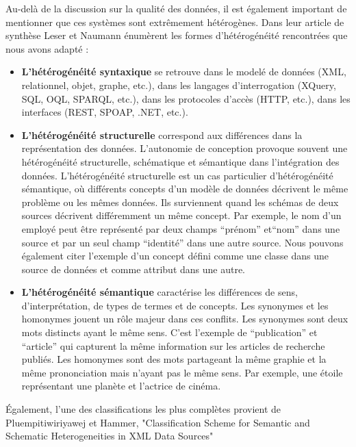  Au-delà de la discussion sur la qualité des données, il est également important de mentionner que ces systèmes sont extrêmement hétérogènes.
 Dans leur article de synthèse Leser et Naumann énumèrent les formes d'hétérogénéité rencontrées que nous avons adapté \cite{dils2006}:\\
 
 \begin{itemize}
     \item  \textbf{L'hétérogénéité syntaxique} se retrouve dans le modelé de données (XML, relationnel, objet, graphe, etc.), dans les langages d’interrogation (XQuery, SQL,  OQL, SPARQL, etc.), dans les protocoles d’accès (HTTP, etc.), dans les interfaces (REST, SPOAP, .NET, etc.).
      
     \item  \textbf{L'hétérogénéité structurelle} correspond aux différences dans la représentation des données. L'autonomie de conception provoque souvent une hétérogénéité structurelle, schématique et sémantique dans l'intégration des données.  L'hétérogénéité structurelle est un cas particulier d'hétérogénéité sémantique, où différents concepts d'un modèle de données décrivent le même problème ou les mêmes données. Ils surviennent quand les schémas de deux sources décrivent différemment un même concept. Par exemple, le nom d’un employé peut être représenté par deux champs “prénom” et“nom” dans une source et par un seul champ “identité” dans une autre source. Nous pouvons également citer l’exemple d’un concept défini comme une classe dans une source de données et comme attribut dans une autre. 

     \item  \textbf{L'hétérogénéité sémantique} caractérise les différences de sens, d'interprétation, de types de termes et de concepts. Les synonymes et les homonymes jouent un rôle majeur dans ces conflits. Les synonymes sont deux  mots distincts ayant le même sens. C’est l’exemple de “publication” et  “article” qui capturent la  même information sur les articles de recherche publiés. Les homonymes sont des mots partageant la même graphie et la même prononciation mais n’ayant pas le même sens. Par   exemple,  une étoile représentant une planète et l'actrice de cinéma. \\

 \end{itemize}
 
 
Également, l'une des classifications les plus complètes provient de Pluempitiwiriyawej et Hammer, "Classification Scheme for Semantic and Schematic Heterogeneities in XML Data Sources"\cite{bergman2006}\\
 

